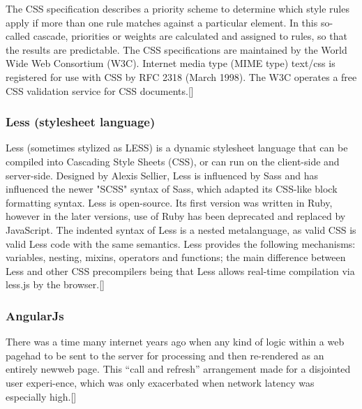 The CSS specification describes a priority scheme to determine which style rules apply if more than one rule matches against a particular element. In this so-called cascade, priorities or weights are calculated and assigned to rules, so that the results are predictable.
The CSS specifications are maintained by the World Wide Web Consortium (W3C). Internet media type (MIME type) text/css is registered for use with CSS by RFC 2318 (March 1998). The W3C operates a free CSS validation service for CSS documents.[\cite{7}]

\subsubsection*{Less (stylesheet language)}
Less (sometimes stylized as LESS) is a dynamic stylesheet language that can be compiled into Cascading Style Sheets (CSS), or can run on the client-side and server-side. Designed by Alexis Sellier, Less is influenced by Sass and has influenced the newer "SCSS" syntax of Sass, which adapted its CSS-like block formatting syntax. Less is open-source. Its first version was written in Ruby, however in the later versions, use of Ruby has been deprecated and replaced by JavaScript. The indented syntax of Less is a nested metalanguage, as valid CSS is valid Less code with the same semantics. Less provides the following mechanisms: variables, nesting, mixins, operators and functions; the main difference between Less and other CSS precompilers being that Less allows real-time compilation via less.js by the browser.[\cite{7}]

\subsubsection*{AngularJs}
There was a time many internet years ago when any kind of logic within a web pagehad to be sent to the server for processing and then re-rendered as an entirely newweb page. This “call and refresh” arrangement made for a disjointed user experi-ence, which was only exacerbated when network latency was especially high.[\cite{1}]  
\newline

